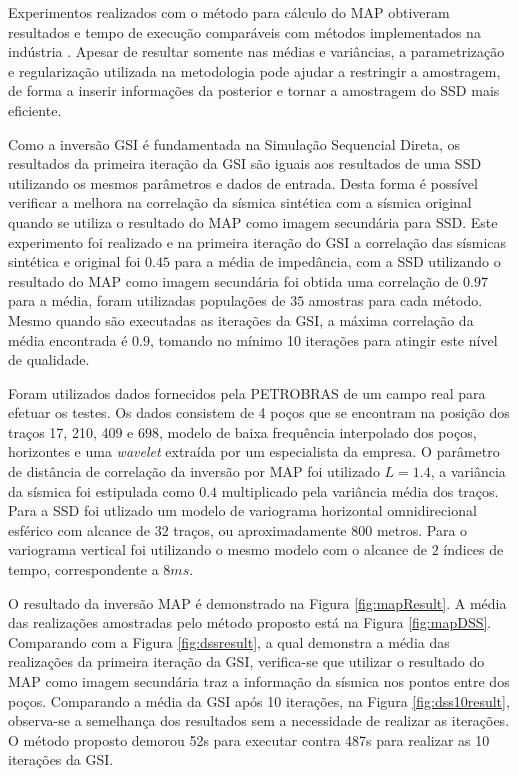 Experimentos realizados com o método para cálculo do MAP obtiveram resultados e
tempo de execução comparáveis com métodos implementados na indústria
\citep{leandroGRSL}. Apesar de resultar somente nas médias e variâncias, a
parametrização e regularização utilizada na metodologia pode ajudar a restringir
a amostragem, de forma a inserir informações da posterior e tornar a amostragem
do SSD mais eficiente.


Como a inversão GSI é fundamentada na Simulação Sequencial Direta, os resultados
da primeira iteração da GSI são iguais aos resultados de uma SSD utilizando os
mesmos parâmetros e dados de entrada. Desta forma é possível verificar a melhora
na correlação da sísmica sintética com a sísmica original quando se utiliza o
resultado do MAP como imagem secundária para SSD. Este experimento foi realizado
e na primeira iteração do GSI a correlação das sísmicas sintética e original foi
$0.45$ para a média de impedância, com a SSD utilizando o resultado do MAP como
imagem secundária foi obtida uma correlação de $0.97$ para a média, foram
utilizadas populações de $35$ amostras para cada método. Mesmo quando são
executadas as iterações da GSI, a máxima correlação da média encontrada é $0.9$,
tomando no mínimo 10 iterações para atingir este nível de qualidade.

Foram utilizados dados fornecidos pela PETROBRAS de um campo real para efetuar
os testes. Os dados consistem de 4 poços que se encontram na posição dos traços
17, 210, 409 e 698, modelo de baixa frequência interpolado dos poços, horizontes
e uma \textit{wavelet} extraída por um especialista da empresa. O parâmetro de
distância de correlação da inversão por MAP foi utilizado $L=1.4$, a variância da sísmica
foi estipulada como $0.4$ multiplicado pela variância média dos traços.
Para a SSD foi utlizado um modelo de variograma horizontal omnidirecional
esférico com alcance de $32$ traços, ou aproximadamente $800$ metros. Para o
variograma vertical foi utilizando o mesmo modelo com o alcance de $2$ índices
de tempo, correspondente a $8ms$.

O resultado da inversão MAP é demonstrado na Figura \ref{fig:mapResult}.
A média das realizações amostradas pelo método proposto está na Figura
\ref{fig:mapDSS}. Comparando com a Figura \ref{fig:dssresult}, a qual demonstra
a média das realizações da primeira iteração da GSI, verifica-se que utilizar o
resultado do MAP como imagem secundária traz a informação da sísmica nos pontos
entre dos poços. Comparando a média da GSI após 10 iterações, na Figura
\ref{fig:dss10result}, observa-se a semelhança dos resultados sem a necessidade
de realizar as iterações. O método proposto demorou 52s para executar contra
487s para realizar as 10 iterações da GSI.



